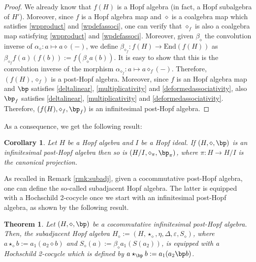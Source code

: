 \documentclass[10pt]{article}
\newtheorem {theorem} [lemma] {Theorem}
\newtheorem {corollary} [lemma] {Corollary}
\theoremstyle{definition}
\renewcommand{\wp}{\diamond}
\begin{document}
\begin{proof}
    We already know that $f(H)$ is a Hopf algebra (in fact, a Hopf subalgebra of $H'$). Moreover, since $f$ is a Hopf algebra map and $\wp$ is a coalgebra map which satisfies \eqref{wpproduct} and \eqref{wpdefassoci}, one can verify that $\wp_{f}$ is also a coalgebra map satisfying \eqref{wpproduct} and \eqref{wpdefassoci}.
Moreover, given $\beta_{\wp}$ the convolution inverse of $\alpha_{\wp}:a\mapsto a\wp(-)$, we define $\beta_{\wp_{f}}:f(H)\to\mathrm{End}(f(H))$ as $\beta_{\wp_{f}}f(a)(f(b)):=f(\beta_{\wp} a(b))$. It is easy to show that this is the convolution inverse of the morphism $\alpha_{\wp_{f}}:a\mapsto a\wp_{f}(-)$.
Therefore, $(f(H),\wp_{f})$ is a post-Hopf algebra. Moreover, since $f$ is an Hopf algebra map and $\bp$ satisfies \eqref{deltalinear}, \eqref{multiplicativity} and \eqref{deformedassociativity},
also $\bp_{f}$ satisfies \eqref{deltalinear}, \eqref{multiplicativity} and \eqref{deformedassociativity}.
Therefore, $(f(H),\wp_{f},\bp_{f})$ is an infinitesimal post-Hopf algebra.
\end{proof}

As a consequence, we get the following result:

\begin{corollary}
    Let $H$ be a Hopf algebra and $I$ be a Hopf ideal. If $(H,\wp,\bp)$ is an infinitesimal post-Hopf algebra then so is $(H/I,\wp_{\pi},\bp_{\pi})$, where $\pi:H\to H/I$ is the canonical projection.
\end{corollary}

As recalled in Remark \ref{rmk:subadj}, given a cocommutative post-Hopf algebra, one can define the so-called subadjacent Hopf algebra. The latter is equipped with a Hochschild 2-cocycle once we start with an infinitesimal post-Hopf algebra, as shown by the following result.

\begin{theorem}\label{thm:Hochschild}
    Let $(H,\wp,\bp)$ be a cocommutative infinitesimal post-Hopf algebra. Then, the subadjacent Hopf algebra $H_{\wp}:=(H,\star_{\wp},\eta,\Delta,\varepsilon,S_{\wp})$, where $a\star_{\wp} b:=a_{1}(a_{2}\wp b)$ and $S_{\wp}(a):=\beta_{\wp}a_{1}(S(a_{2}))$, is equipped with a Hochschild 2-cocycle which is defined by $a\star_{\bp}b:=a_{1}(a_{2}\bp b)$.
\end{theorem}
\end{document}
